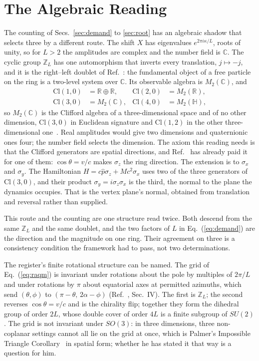 \documentclass[aps,prd,twocolumn,superscriptaddress,nofootinbib]{revtex4-2}
\begin{document}
\section{The Algebraic Reading}
\label{sec:algebra}

The counting of Secs.~\ref{sec:demand} to \ref{sec:root} has an algebraic shadow that selects three by a different route. The shift $X$ has eigenvalues $e^{2\pi i\kappa/L}$, roots of unity, so for $L > 2$ the amplitudes are complex and the number field is $\mathbb{C}$. The cyclic group $\mathbb{Z}_L$ has one automorphism that inverts every translation, $j \mapsto -j$, and it is the right--left doublet of Ref.~\cite{korytko2026c}: the fundamental object of a free particle on the ring is a two-level system over $\mathbb{C}$. Its observable algebra is $M_2(\mathbb{C})$, and
\begin{align}
\mathrm{Cl}(1,0) &= \mathbb{R}\oplus\mathbb{R}, & \mathrm{Cl}(2,0) &= M_2(\mathbb{R}), \nonumber\\
\mathrm{Cl}(3,0) &= M_2(\mathbb{C}), & \mathrm{Cl}(4,0) &= M_2(\mathbb{H}),
\label{eq:clifford}
\end{align}
so $M_2(\mathbb{C})$ is the Clifford algebra of a three-dimensional space and of no other dimension, $\mathrm{Cl}(3,0)$ in Euclidean signature and $\mathrm{Cl}(1,2)$ in the other three-dimensional one~\cite{lounesto2001}. Real amplitudes would give two dimensions and quaternionic ones four; the number field selects the dimension. The axiom this reading needs is that the Clifford generators are spatial directions, and Ref.~\cite{korytko2026c} has already paid it for one of them: $\cos\theta = v/c$ makes $\sigma_z$ the ring direction. The extension is to $\sigma_x$ and $\sigma_y$. The Hamiltonian $H = c\hat p\sigma_z + Mc^2\sigma_x$ uses two of the three generators of $\mathrm{Cl}(3,0)$, and their product $\sigma_y = i\sigma_z\sigma_x$ is the third, the normal to the plane the dynamics occupies. That is the vertex plane's normal, obtained from translation and reversal rather than supplied.

This route and the counting are one structure read twice. Both descend from the same $\mathbb{Z}_L$ and the same doublet, and the two factors of $L$ in Eq.~(\ref{eq:demand}) are the direction and the magnitude on one ring. Their agreement on three is a consistency condition the framework had to pass, not two determinations.

The register's finite rotational structure can be named. The grid of Eq.~(\ref{eq:raqm}) is invariant under rotations about the pole by multiples of $2\pi/L$ and under rotations by $\pi$ about equatorial axes at permitted azimuths, which send $(\theta,\phi)$ to $(\pi-\theta,\,2\alpha-\phi)$ (Ref.~\cite{korytko2026c}, Sec.~IV). The first is $\mathbb{Z}_L$; the second reverses $\cos\theta = v/c$ and is the chirality flip; together they form the dihedral group of order $2L$, whose double cover of order $4L$ is a finite subgroup of $SU(2)$. The grid is not invariant under $SO(3)$: in three dimensions, three non-coplanar settings cannot all lie on the grid at once, which is Palmer's Impossible Triangle Corollary~\cite{palmer2026b,palmer2026c} in spatial form; whether he has stated it that way is a question for him.
\end{document}
